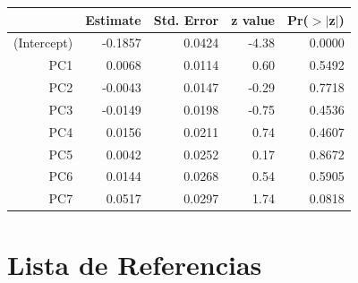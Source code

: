 \documentclass[a4paper,12pt]{Latex/Classes/PhDthesisPSnPDF}
\begin{document}
\begin{center}
\begin{table}[ht]
\centering
\begin{tabular}{rrrrr}
  \hline
 & Estimate & Std. Error & z value & Pr($>$$|$z$|$) \\ 
  \hline
(Intercept) & -0.1857 & 0.0424 & -4.38 & 0.0000 \\ 
  PC1 & 0.0068 & 0.0114 & 0.60 & 0.5492 \\ 
  PC2 & -0.0043 & 0.0147 & -0.29 & 0.7718 \\ 
  PC3 & -0.0149 & 0.0198 & -0.75 & 0.4536 \\ 
  PC4 & 0.0156 & 0.0211 & 0.74 & 0.4607 \\ 
  PC5 & 0.0042 & 0.0252 & 0.17 & 0.8672 \\ 
  PC6 & 0.0144 & 0.0268 & 0.54 & 0.5905 \\ 
  PC7 & 0.0517 & 0.0297 & 1.74 & 0.0818 \\ 
   \hline
\end{tabular}
\end{table}\end{center}


\chapter*{Lista de Referencias}
\end{document}
